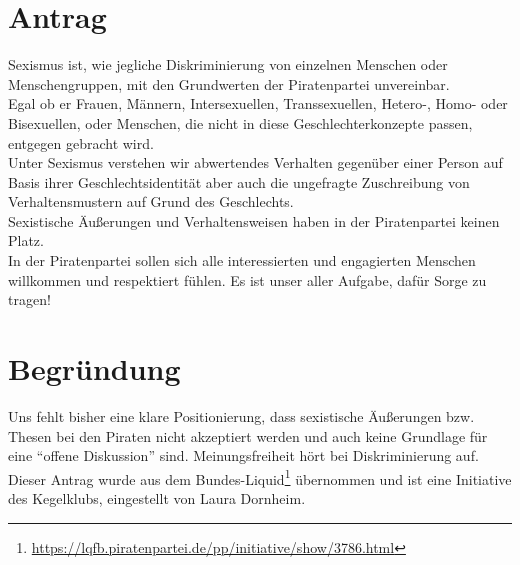 \section{Antrag}

Sexismus ist, wie jegliche Diskriminierung von einzelnen Menschen oder Menschengruppen, mit den Grundwerten der Piratenpartei unvereinbar.\\Egal ob er Frauen, Männern, Intersexuellen, Transsexuellen, Hetero-, Homo- oder Bisexuellen, oder Menschen, die nicht in diese Geschlechterkonzepte passen, entgegen gebracht wird.\\Unter Sexismus verstehen wir abwertendes Verhalten gegenüber einer Person auf Basis ihrer Geschlechtsidentität aber auch die ungefragte Zuschreibung von Verhaltensmustern auf Grund des Geschlechts.\\Sexistische Äußerungen und Verhaltensweisen haben in der Piratenpartei keinen Platz.\\In der Piratenpartei sollen sich alle interessierten und engagierten Menschen willkommen und respektiert fühlen. Es ist unser aller Aufgabe, dafür Sorge zu tragen!

\section{Begründung}

Uns fehlt bisher eine klare Positionierung, dass sexistische Äußerungen bzw. Thesen bei den Piraten nicht akzeptiert werden und auch keine Grundlage für eine ``offene Diskussion'' sind. Meinungsfreiheit hört bei Diskriminierung auf. Dieser Antrag wurde aus dem Bundes-Liquid\footnote{\url{https://lqfb.piratenpartei.de/pp/initiative/show/3786.html}} übernommen und ist eine Initiative des Kegelklubs, eingestellt von Laura Dornheim.
